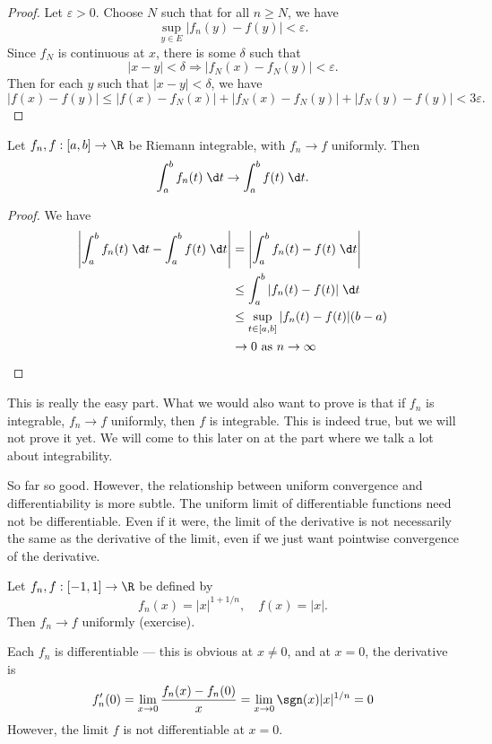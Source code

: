 \documentclass[a4paper]{article}
\begin{document}
\begin{proof}
  Let $\varepsilon > 0$. Choose $N$ such that for all $n \geq N$, we have
  \[
    \sup_{y\in E}|f_n(y) - f(y)| < \varepsilon.
  \]
  Since $f_N$ is continuous at $x$, there is some $\delta$ such that
  \[
    |x - y| < \delta \Rightarrow |f_N(x) - f_N(y)| < \varepsilon.
  \]
  Then for each $y$ such that $|x - y| < \delta$, we have
  \[
    |f(x) - f(y)| \leq |f(x) - f_N(x)| + |f_N(x) - f_N(y)| + |f_N(y) - f(y)| < 3\varepsilon.
  \]
\end{proof}

\begin{thm}
  Let $f_n, f: [a, b]\to \R$ be Riemann integrable, with $f_n \to f$ uniformly. Then
  \[
    \int_a^b f_n(t)\;\d t \to \int_a^b f(t)\;\d t.
  \]
\end{thm}

\begin{proof}
  We have
  \begin{align*}
    \left|\int_a^b f_n(t) \;\d t - \int_a^b f(t)\;\d t\right| &= \left|\int_a^b f_n(t) - f(t)\;\d t\right|\\
    &\leq \int_a^b |f_n(t) - f(t)|\;\d t\\
    &\leq \sup_{t\in [a, b]}|f_n(t) - f(t)| (b - a)\\
    &\to 0\text{ as }n\to \infty
  \end{align*}
\end{proof}
This is really the easy part. What we would also want to prove is that if $f_n$ is integrable, $f_n \to f$ uniformly, then $f$ is integrable. This is indeed true, but we will not prove it yet. We will come to this later on at the part where we talk a lot about integrability.

So far so good. However, the relationship between uniform convergence and differentiability is more subtle. The uniform limit of differentiable functions need not be differentiable. Even if it were, the limit of the derivative is not necessarily the same as the derivative of the limit, even if we just want pointwise convergence of the derivative.

\begin{eg}
  Let $f_n, f: [-1, 1] \to \R$ be defined by
  \[
    f_n(x) = |x|^{1 + 1/n}, \quad f(x) = |x|.
  \]
  Then $f_n \to f$ uniformly (exercise).

  Each $f_n$ is differentiable --- this is obvious at $x \not= 0$, and at $x = 0$, the derivative is
  \[
    f_n'(0) = \lim_{x \to 0}\frac{f_n (x) - f_n(0)}{x} = \lim_{x \to 0} \sgn(x) |x|^{1/n} = 0
  \]
  However, the limit $f$ is not differentiable at $x = 0$.
\end{eg}
\end{document}
